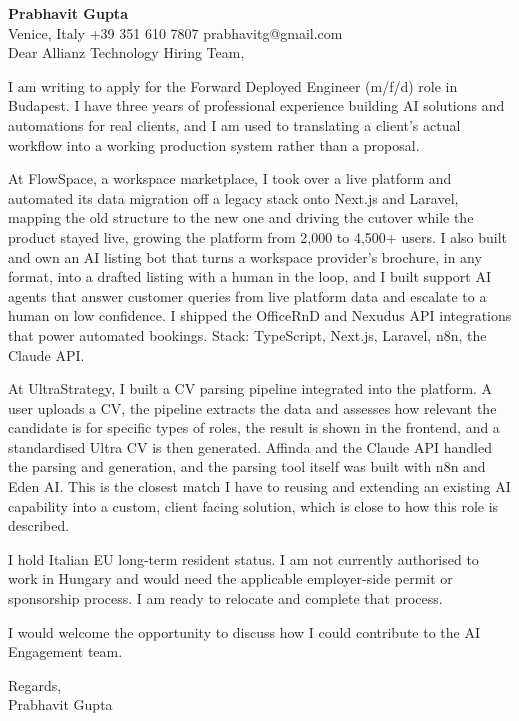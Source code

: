 \documentclass[a4paper,10.5pt]{article}
\begin{document}
\textbf{Prabhavit Gupta}\\
Venice, Italy \textbar{} +39 351 610 7807 \textbar{} prabhavitg@gmail.com\\[10pt]
Dear Allianz Technology Hiring Team,

I am writing to apply for the Forward Deployed Engineer (m/f/d) role in Budapest. I have three years of professional experience building AI solutions and automations for real clients, and I am used to translating a client's actual workflow into a working production system rather than a proposal.

At FlowSpace, a workspace marketplace, I took over a live platform and automated its data migration off a legacy stack onto Next.js and Laravel, mapping the old structure to the new one and driving the cutover while the product stayed live, growing the platform from 2,000 to 4,500+ users. I also built and own an AI listing bot that turns a workspace provider's brochure, in any format, into a drafted listing with a human in the loop, and I built support AI agents that answer customer queries from live platform data and escalate to a human on low confidence. I shipped the OfficeRnD and Nexudus API integrations that power automated bookings. Stack: TypeScript, Next.js, Laravel, n8n, the Claude API.

At UltraStrategy, I built a CV parsing pipeline integrated into the platform. A user uploads a CV, the pipeline extracts the data and assesses how relevant the candidate is for specific types of roles, the result is shown in the frontend, and a standardised Ultra CV is then generated. Affinda and the Claude API handled the parsing and generation, and the parsing tool itself was built with n8n and Eden AI. This is the closest match I have to reusing and extending an existing AI capability into a custom, client facing solution, which is close to how this role is described.

I hold Italian EU long-term resident status. I am not currently authorised to work in Hungary and would need the applicable employer-side permit or sponsorship process. I am ready to relocate and complete that process.

I would welcome the opportunity to discuss how I could contribute to the AI Engagement team.

Regards,\\
Prabhavit Gupta
\end{document}
